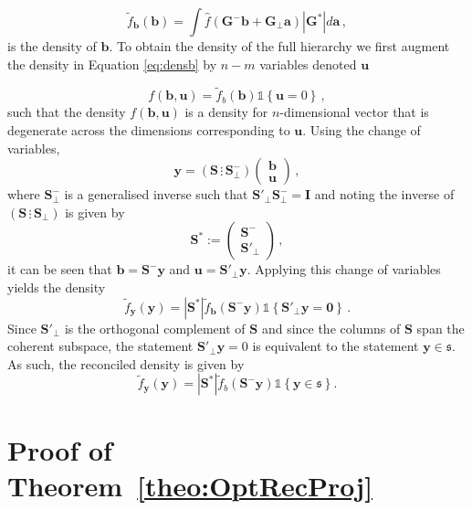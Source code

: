 \documentclass[12pt]{article}
\theoremstyle{definition}
\begin{document}
\begin{equation}
\tilde{f}_{\bm{b}}(\bm{b})=\int\hat{f}(\bm{G}^{-}\bm{b}+\bm{G}_{\perp}\bm{a})|\bm{G}^*|d{\bm a}\,,
\label{eq:densb}
\end{equation}
is the density of ${\bm b}$. To obtain the density of the full hierarchy we first augment the density in Equation \eqref{eq:densb} by $n-m$ variables denoted $\bm{u}$

\begin{equation}
f(\bm{b},\bm{u})=\tilde{f}_b(\bm{b})\mathbb{1}\left\{\bm{u}=0\right\}\,,
\end{equation}
such that the density $f(\bm{b},\bm{u})$ is a density for $n$-dimensional vector that is degenerate across the dimensions corresponding to $\bm{u}$.  Using the change of variables,
\[
\bm{y}=\left(\bm{S}\,\vdots\,\bm{S}^-_{\perp}\right)\begin{pmatrix}\bm{b}\\\bm{u}
\end{pmatrix}\,,
\]
where $\bm{S}^-_{\perp}$ is a generalised inverse such that $\bm{S}'_{\perp}\bm{S}^-_{\perp}=\bm{I}$ and noting the inverse of $\left(\bm{S}\,\vdots\,\bm{S}_{\perp}\right)$ is given by
\[
\bm{S}^*:=\begin{pmatrix}\bm{S}^{-}\\\bm{S}'_{\perp}\end{pmatrix}\,,
\]
it can be seen that $\bm{b}=\bm{S}^-\bm{y}$ and $\bm{u}=\bm{S}'_\perp\bm{y}$.  Applying this change of variables yields the density
\[
\tilde{f}_{\bm{y}}(\bm{y})=|\bm{S}^*|\tilde{f}_{\bm b}(\bm{S}^-\bm{y})\mathbb{1}\left\{\bm{S}'_\perp\bm{y}=\bm{0}\right\}\,.
\]
Since $\bm{S}'_\perp$ is the orthogonal complement of $\bm{S}$ and since the columns of $\bm{S}$ span the coherent subspace, the statement $\bm{S}'_\perp\bm{y}=0$ is equivalent to the statement $\bm{y}\in\mathfrak{s}$.  As such, the reconciled density is given by
\[
\tilde{f}_{\bm{y}}(\bm{y})=|\bm{S}^*|\tilde{f}_b(\bm{S}^-\bm{y})\mathbb{1}\left\{\bm{y}\in\mathfrak{s}\right\}.
\]
\clearpage
\section{Proof of Theorem~\ref{theo:OptRecProj}}
\label{app:OptRecProj}
\end{document}
